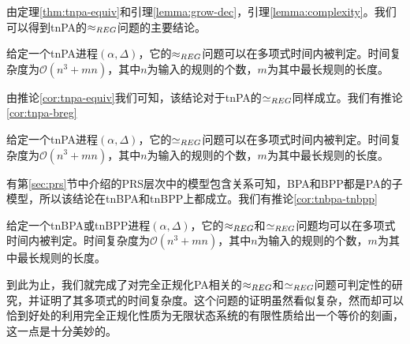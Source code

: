 由定理\ref{thm:tnpa-equiv}和引理\ref{lemma:grow-dec}，引理\ref{lemma:complexity}。我们可以得到tnPA的$\approx_{REG}$问题的主要结论。

\begin{thm}\label{thm:tnpa-wreg}
给定一个tnPA进程$(\alpha,\Delta)$，它的$\approx_{REG}$问题可以在多项式时间内被判定。时间复杂度为$\mathcal{O}(n^3+mn)$，其中$n$为输入的规则的个数，$m$为其中最长规则的长度。
\end{thm}

由推论\ref{cor:tnpa-equiv}我们可知，该结论对于tnPA的$\simeq_{REG}$同样成立。我们有推论\ref{cor:tnpa-breg}

\begin{cor}\label{cor:tnpa-breg}
给定一个tnPA进程$(\alpha,\Delta)$，它的$\simeq_{REG}$问题可以在多项式时间内被判定。时间复杂度为$\mathcal{O}(n^3+mn)$，其中$n$为输入的规则的个数，$m$为其中最长规则的长度。
\end{cor}

有第\ref{sec:prs}节中介绍的PRS层次中的模型包含关系可知，BPA和BPP都是PA的子模型，所以该结论在tnBPA和tnBPP上都成立。我们有推论\ref{cor:tnbpa-tnbpp}

\begin{cor}\label{cor:tnbpa-tnbpp}
给定一个tnBPA或tnBPP进程$(\alpha,\Delta)$，它的$\approx_{REG}$和$\simeq_{REG}$问题均可以在多项式时间内被判定。时间复杂度为$\mathcal{O}(n^3+mn)$，其中$n$为输入的规则的个数，$m$为其中最长规则的长度。
\end{cor}

到此为止，我们就完成了对完全正规化PA相关的$\approx_{REG}$和$\simeq_{REG}$问题可判定性的研究，并证明了其多项式的时间复杂度。这个问题的证明虽然看似复杂，然而却可以恰到好处的利用完全正规化性质为无限状态系统的有限性质给出一个等价的刻画，这一点是十分美妙的。
